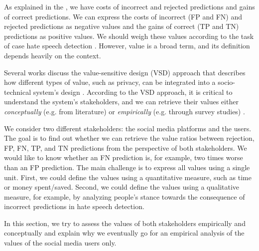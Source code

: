 %
As explained in the , we have costs of incorrect and rejected predictions and gains of correct predictions.
%
We can express the costs of incorrect (FP and FN) and rejected predictions as negative values and the gains of correct (TP and TN) predictions as positive values.
%
We should weigh these values according to the task of case hate speech detection \citep{sayin2021science}.
%
However, value is a broad term, and its definition depends heavily on the context.
%

%
Several works discuss the value-sensitive design (VSD) approach that describes how different types of value, such as privacy, can be integrated into a socio-technical system's design \citep{zhu2018value, umbrello2021mapping}.
%
According to the VSD approach, it is critical to understand the system's stakeholders, and we can retrieve their values either \emph{conceptually} (e.g. from literature) or \emph{empirically} (e.g. through survey studies) \citep{zhu2018value, umbrello2021mapping}.
%

%
We consider two different stakeholders: the social media platforms and the users.
%
The goal is to find out whether we can retrieve the value ratios between rejection, FP, FN, TP, and TN predictions from the perspective of both stakeholders.
%
We would like to know whether an FN prediction is, for example, two times worse than an FP prediction.
%
The main challenge is to express all values using a single unit.
%
First, we could define the values using a quantitative measure, such as time or money spent/saved.
%
Second, we could define the values using a qualitative measure, for example, by analyzing people's stance towards the consequence of incorrect predictions in hate speech detection.
%

%
In this section, we try to assess the values of both stakeholders empirically and conceptually and explain why we eventually go for an empirical analysis of the values of the social media users only.
%




